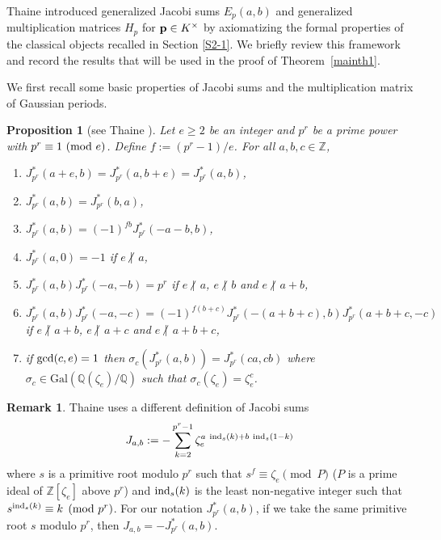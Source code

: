 \documentclass[a4paper, 11pt]{amsart}
\newcommand{\notmid}{\mathrel{\ooalign{$\mkern-5mu\not$\crcr$|$}}}
\newcommand{\Z}{\mathbb Z}
\newcommand{\Q}{\mathbb Q}
\newcommand{\Gal}{\mathrm{Gal}}
\theoremstyle{plain}
\newtheorem{prop}[thm]{Proposition}
\theoremstyle{definition}
\newtheorem{remark}[thm]{Remark}
\numberwithin{equation}{section}
\begin{document}
Thaine \cite[Section 3]{Tha04} introduced generalized Jacobi sums $E_p(a,b)$ and generalized multiplication matrices $H_p$ for ${\bf p}\in K^\times$ by axiomatizing the formal properties of the classical objects recalled in Section \ref{S2-1}. 
We briefly review this framework and record the results that will be used in the proof of Theorem~\ref{mainth1}.

We first recall some basic properties of Jacobi sums and 
the multiplication matrix of Gaussian periods.
%
\begin{prop}[{see Thaine \cite[Proposition~7]{Tha04}}]\label{prop:T7}
Let $e \geq 2$ be an  
integer and $p^r$ be a prime power with $p^r\equiv 1\ ({\rm mod}\ e)$. 
Define $f:=(p^r-1)/e$. 
For all $a,b,c \in \Z$,
\begin{enumerate}
  \setlength{\parskip}{0cm}
  \setlength{\itemsep}{0cm}
\item $J^\ast_{p^r}(a+e,b)=J^\ast_{p^r}(a,b+e)=J^\ast_{p^r}(a,b)$,
\item $J^\ast_{p^r}(a,b)=J^\ast_{p^r}(b,a)$,
\item $J^\ast_{p^r}(a,b)=(-1)^{fb}J^\ast_{p^r}(-a-b,b)$,
\item $J^\ast_{p^r}(a,0)=-1$ if $e$ $\notmid$ $a$,
\item $J^\ast_{p^r}(a,b)J^\ast_{p^r}(-a,-b) = p^r$ 
if $e$ $\notmid$ $a$, $e$ $\notmid$ $b$ and $e$ $\notmid$ $a+b$,
\item $J^\ast_{p^r}(a,b)J^\ast_{p^r}(-a,-c) = (-1)^{f(b+c)}J^\ast_{p^r}(-(a+b+c),b)J^\ast_{p^r}(a+b+c,-c)$ if $e$ $\notmid$ $a+b$, 
$e$ $\notmid$ $a+c$ and $e$ $\notmid$ $a+b+c$,
\item if ${\rm gcd}(c,e)=1$ then $\sigma_c (J^\ast_{p^r}(a,b))=J^\ast_{p^r}(ca,cb)$ where $\sigma_c \in \Gal(\Q(\zeta_e)/\Q)$ such that $\sigma_c(\zeta_e)=\zeta_e^c$.
\end{enumerate}
\end{prop}

\begin{remark}\label{rem:DefJacobi}
Thaine \cite{Tha04} uses a different definition of Jacobi sums 
\[
J_{a,b} := -\sum_{k=2}^{p^r-1}\zeta_e^{a\ {\rm ind}_{s}(k)+b\ {\rm ind}_{s}(1-k)}
\]
where  
$s$ is a primitive root modulo $p^r$ such that $s^f \equiv \zeta_e \pmod{P}$ 
($P$ is a prime ideal of $\Z[\zeta_e]$ above $p^r$) and 
${\rm ind}_{s}(k)$ is the least non-negative integer such that 
$s^{{\rm ind}_s(k)}\equiv k \pmod{p^r}$. 
For our notation $J^\ast_{p^r}(a,b)$, 
if we take the same primitive root $s$ modulo $p^r$, 
then $J_{a,b}=-J^\ast_{p^r}(a,b)$.
\end{remark}
\end{document}
